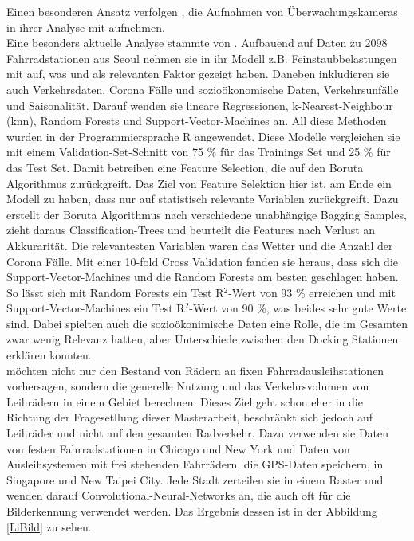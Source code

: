 \documentclass[a4paper,12pt]{thesis}
\begin{document}
Einen besonderen Ansatz verfolgen \cite{Colace2020}, die Aufnahmen von Überwachungskameras in ihrer Analyse mit aufnehmen.\\
Eine besonders aktuelle Analyse stammte von \cite{Gao2022}. Aufbauend auf Daten zu 2098 Fahrradstationen aus Seoul nehmen sie in ihr Modell z.B. Feinstaubbelastungen mit auf, was \cite{Hong2022} und \cite{ZHAO2018826} als relevanten Faktor gezeigt haben. Daneben inkludieren sie auch Verkehrsdaten, Corona Fälle und sozioökonomische Daten, Verkehrsunfälle und Saisonalität. Darauf wenden sie lineare Regressionen, k-Nearest-Neighbour (knn), Random Forests und Support-Vector-Machines an. All diese Methoden wurden in der Programmiersprache R angewendet. Diese Modelle vergleichen sie mit einem Validation-Set-Schnitt von 75 \% für das Trainings Set und 25 \% für das Test Set. Damit betreiben \cite{Gao2022} eine Feature Selection, die auf den Boruta Algorithmus zurückgreift. Das Ziel von Feature Selektion hier ist, am Ende ein Modell zu haben, dass nur auf statistisch relevante Variablen zurückgreift. Dazu erstellt der Boruta Algorithmus nach \cite{Kursa2010} verschiedene unabhängige Bagging Samples, zieht daraus Classification-Trees und beurteilt die Features nach Verlust an Akkurarität. Die relevantesten Variablen waren das Wetter und die Anzahl der Corona Fälle. Mit einer 10-fold Cross Validation fanden sie heraus, dass sich die Support-Vector-Machines und die Random Forests am besten geschlagen haben. So lässt sich mit Random Forests ein Test R$^2$-Wert von 93 \% erreichen und mit Support-Vector-Machines ein Test R$^2$-Wert von 90 \%, was beides sehr gute Werte sind. Dabei spielten auch die sozioökonimische Daten eine Rolle, die im Gesamten zwar wenig Relevanz hatten, aber Unterschiede zwischen den Docking Stationen erklären konnten.\\ 
\cite{Li2022} möchten nicht nur den Bestand von Rädern an fixen Fahrradausleihstationen vorhersagen, sondern die generelle Nutzung und das Verkehrsvolumen von Leihrädern in einem Gebiet berechnen. Dieses Ziel geht schon eher in die Richtung der Fragesetllung dieser Masterarbeit, beschränkt sich jedoch auf Leihräder und nicht auf den gesamten Radverkehr. Dazu verwenden sie Daten von festen Fahrradstationen in Chicago und New York und Daten von Ausleihsystemen mit frei stehenden Fahrrädern, die GPS-Daten speichern, in Singapore und New Taipei City. Jede Stadt zerteilen sie in einem Raster und wenden darauf Convolutional-Neural-Networks an, die auch oft für die Bilderkennung verwendet werden. Das Ergebnis dessen ist in der Abbildung \ref{LiBild} zu sehen.\\
\end{document}
